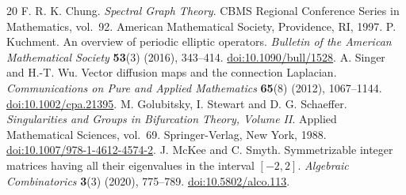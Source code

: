 \begin{thebibliography}{20}
 F. R. K. Chung. \emph{Spectral Graph Theory}. CBMS Regional Conference Series in Mathematics, vol.~92. American Mathematical Society, Providence, RI, 1997.
 P. Kuchment. An overview of periodic elliptic operators. \emph{Bulletin of the American Mathematical Society} \textbf{53}(3) (2016), 343--414. \href{https://doi.org/10.1090/bull/1528}{doi:10.1090/bull/1528}.
 A. Singer and H.-T. Wu. Vector diffusion maps and the connection Laplacian. \emph{Communications on Pure and Applied Mathematics} \textbf{65}(8) (2012), 1067--1144. \href{https://doi.org/10.1002/cpa.21395}{doi:10.1002/cpa.21395}.
 M. Golubitsky, I. Stewart and D. G. Schaeffer. \emph{Singularities and Groups in Bifurcation Theory, Volume II}. Applied Mathematical Sciences, vol.~69. Springer-Verlag, New York, 1988. \href{https://doi.org/10.1007/978-1-4612-4574-2}{doi:10.1007/978-1-4612-4574-2}.
 J. McKee and C. Smyth. Symmetrizable integer matrices having all their eigenvalues in the interval \([-2,2]\). \emph{Algebraic Combinatorics} \textbf{3}(3) (2020), 775--789. \href{https://doi.org/10.5802/alco.113}{doi:10.5802/alco.113}.
\end{thebibliography}
